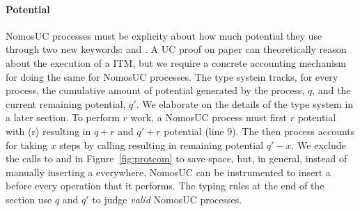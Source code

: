 \paragraph{Potential}
NomosUC processes must be explicity about how much potential they use through two new keywords: \inline{$\ngenpot$} and \inline{$\ntick$}.
A UC proof on paper can theoretically reason about the execution of a ITM, but we require a concrete accounting mechanism for doing the same for NomosUC processes. 
The type system tracks, for every process, the cumulative amount of potential generated by the process, $q$, and the current remaining potential, $q'$. We elaborate on the details of the type system in a later section.
To perform $r$ work, a NomosUC process must first $r$ potential with \inline{$\ngenpot$}(r) resulting in $q+r$ and $q'+r$ potential (line 9).
The then process accounts for taking $x$ steps by calling  resulting in remaining potential $q'-x$.
We exclude the calls to \igp and \itick in Figure~\ref{fig:protcom} to save space, but, in general, instead of manually inserting a \itick everywhere, NomosUC can be instrumented to insert a \itick before every operation that it performs.
The typing rules at the end of the section use $q$ and $q'$ to judge \emph{valid} NomosUC processes.

